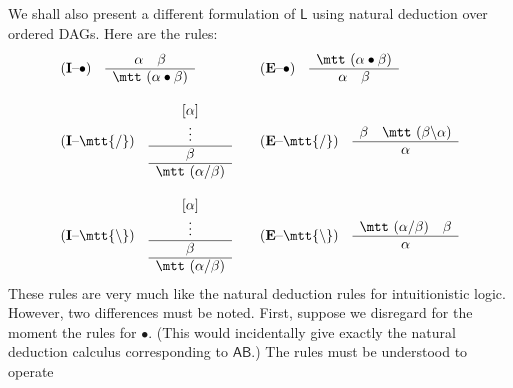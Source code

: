 We shall also present a different formulation of $\mathsf{L}$ using
natural deduction over ordered DAGs. Here are the rules:
\begin{equation}
$$\begin{array}{l@{\qquad}l}
\mbox{\rm (\textbf{I}--$\bullet$)}\quad
\begin{array}{c}
\alpha\quad\beta \\\hline
\mbox{\mtt ($\alpha\bullet\beta$)}
\end{array}
    &
\mbox{\rm (\textbf{E}--$\bullet$)}\quad
\begin{array}{c}
\mbox{\mtt ($\alpha\bullet\beta$)} \\\hline
\alpha \quad \beta
\end{array}
    \\
    \\
\mbox{\rm (\textbf{I}--{\mtt{\tf}})}\quad
\begin{array}{c}
[\alpha] \\
\vdots   \\\hline \beta \\\hline \mbox{\mtt ($\alpha${\tf}$\beta$)}
\end{array}
    &
\mbox{\rm (\textbf{E}--{\mtt{\tf}})}\quad
\begin{array}{c}
\beta \quad \mbox{\mtt ($\beta${\tb}$\alpha$)} \\\hline
\alpha
\end{array}
    \\
    \\
\mbox{\rm (\textbf{I}--{\mtt{\tb}})}\quad
\begin{array}{c}
[\alpha] \\
\vdots   \\\hline \beta \\\hline 
\mbox{\mtt ($\alpha${\tf}$\beta$)}
\end{array}
    &
\mbox{\rm (\textbf{E}--{\mtt{\tb}})}\quad
\begin{array}{c}
\mbox{\mtt ($\alpha${\tf}$\beta$)} \quad \beta \\\hline
\alpha
\end{array}
\end{array}$$
\end{equation}
These rules are very much like the natural deduction rules for
intuitionistic logic. However, two differences must be noted.
First, suppose we disregard for the moment the rules for $\bullet$. 
(This would incidentally give exactly the natural deduction calculus
corresponding to $\mathsf{AB}$.) The rules must be understood to operate 
